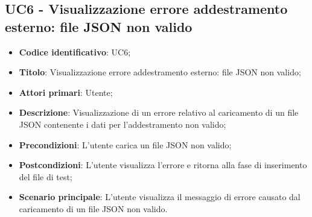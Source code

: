 \subsection{UC6 - Visualizzazione errore addestramento esterno: file JSON non valido}
\begin{itemize}
	\item \textbf{Codice identificativo}: UC6;
	\item \textbf{Titolo}: Visualizzazione errore addestramento esterno: file JSON non valido;
	\item \textbf{Attori primari}: Utente;
	\item \textbf{Descrizione}: Visualizzazione di un errore relativo al caricamento di un file JSON contenente i dati per l'addestramento non valido;
	\item \textbf{Precondizioni}: L'utente carica un file JSON non valido;
	\item \textbf{Postcondizioni}: L'utente visualizza l'errore e ritorna alla fase di inserimento del file di test;	
	\item \textbf{Scenario principale}: L'utente visualizza il messaggio di errore causato dal caricamento di un file JSON non valido.	
\end{itemize}
